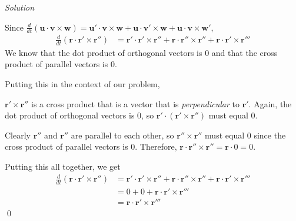 \documentclass{article}
\newcommand{\Solution}{\textit{Solution}}
\begin{document}
\Solution

Since $\displaystyle\frac{d}{dt}\left(\mathbf{u}\cdot\mathbf{v}\times\mathbf{w}\right)=\mathbf{u}'\cdot\mathbf{v}\times\mathbf{w}+\mathbf{u}\cdot\mathbf{v}'\times\mathbf{w}+\mathbf{u}\cdot\mathbf{v}\times\mathbf{w}'$,
\begin{align*}
    \frac{d}{dt}\left(\mathbf{r}\cdot\mathbf{r}'\times\mathbf{r}''\right)&=\mathbf{r}'\cdot\mathbf{r}'\times\mathbf{r}''+\mathbf{r}\cdot\mathbf{r}''\times\mathbf{r}''+\mathbf{r}\cdot\mathbf{r}'\times\mathbf{r}'''\tag{plug n chug}
\end{align*}
We know that the dot product of orthogonal vectors is $0$ and that the cross product of parallel vectors is $0$. 

Putting this in the context of our problem, 

$\mathbf{r}'\times\mathbf{r}''$ is a cross product that is a vector that is \textit{perpendicular} to $\mathbf{r}'$. Again, the dot product of orthogonal vectors is $0$, so $\mathbf{r}'\cdot(\mathbf{r}'\times\mathbf{r}'')$ must equal $0$.

Clearly $\mathbf{r}''$ and $\mathbf{r}''$ are parallel to each other, so $\mathbf{r}''\times\mathbf{r}''$ must equal $0$ since the cross product of parallel vectors is $0$. Therefore, $\mathbf{r}\cdot\mathbf{r}''\times\mathbf{r}''=\mathbf{r}\cdot0=0$.

Putting this all together, we get
\begin{align*}
    \frac{d}{dt}\left(\mathbf{r}\cdot\mathbf{r}'\times\mathbf{r}''\right)&=\mathbf{r}'\cdot\mathbf{r}'\times\mathbf{r}''+\mathbf{r}\cdot\mathbf{r}''\times\mathbf{r}''+\mathbf{r}\cdot\mathbf{r}'\times\mathbf{r}'''\\
    &=0+0+\mathbf{r}\cdot\mathbf{r}'\times\mathbf{r}'''\\
    &=\boxed{\mathbf{r}\cdot\mathbf{r}'\times\mathbf{r}'''}
\end{align*}\qed
\end{document}
